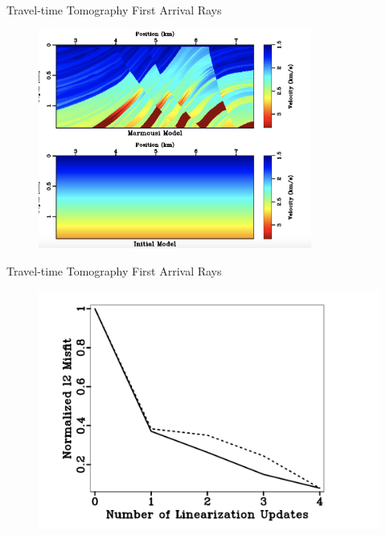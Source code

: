 \documentclass[xcolor=dvipsnames,notes]{beamer}
\begin{document}
\begin{frame}{Travel-time Tomography}
First Arrival Rays
\begin{figure}
  \includegraphics[width=0.8\textwidth]{Fig/figb.png}
\end{figure}
\end{frame}
\begin{frame}{Travel-time Tomography}
First Arrival Rays
\begin{figure}
  \includegraphics[width=\textwidth]{Fig/figc.png}
\end{figure}
\end{frame}
\end{document}
